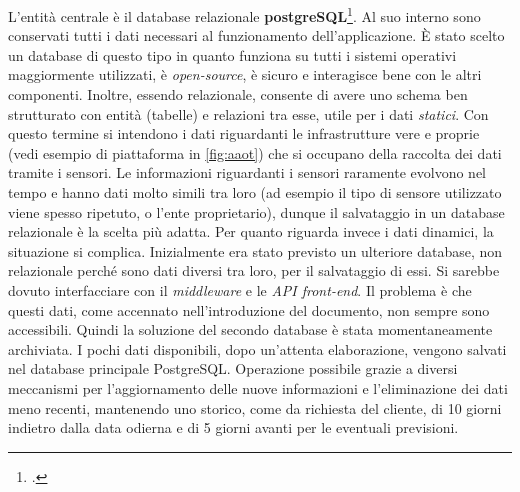 \documentclass[./main.tex]{subfiles}
\begin{document}
L'entità centrale è il database relazionale \textbf{postgreSQL}\footcite[\url{https://www.postgresql.org/}]{website-postgres}. Al suo interno sono conservati tutti i dati necessari al funzionamento dell'applicazione. È stato scelto un database di questo tipo in quanto funziona su tutti i sistemi operativi maggiormente utilizzati, è \textit{open-source}, è sicuro e interagisce bene con le altri componenti. Inoltre, essendo relazionale, consente di avere uno schema ben strutturato con entità (tabelle) e relazioni tra esse, utile per i dati \textit{statici}. Con questo termine si intendono i dati riguardanti le infrastrutture vere e proprie (vedi esempio di piattaforma in \autoref{fig:aaot})  che si occupano della raccolta dei dati tramite i sensori. Le informazioni riguardanti i sensori raramente evolvono nel tempo e hanno dati molto simili tra loro (ad esempio il tipo di sensore utilizzato viene spesso ripetuto, o l'ente proprietario), dunque il salvataggio in un database relazionale è la scelta più adatta. Per quanto riguarda invece i dati dinamici, la situazione si complica. Inizialmente era stato previsto un ulteriore database, non relazionale perché sono dati diversi tra loro,  per il salvataggio di essi. Si sarebbe dovuto interfacciare con il \textit{middleware} e le \textit{API front-end}. Il problema è che questi dati, come accennato nell'introduzione del documento, non sempre sono accessibili. Quindi la soluzione del secondo database è stata momentaneamente archiviata. I pochi dati disponibili, dopo un'attenta elaborazione, vengono salvati nel database principale PostgreSQL. Operazione possibile grazie a diversi meccanismi per l'aggiornamento delle nuove informazioni e l'eliminazione dei dati meno recenti, mantenendo uno storico, come da richiesta del cliente, di 10 giorni indietro dalla data odierna e di 5 giorni avanti per le eventuali previsioni.\par
\end{document}
